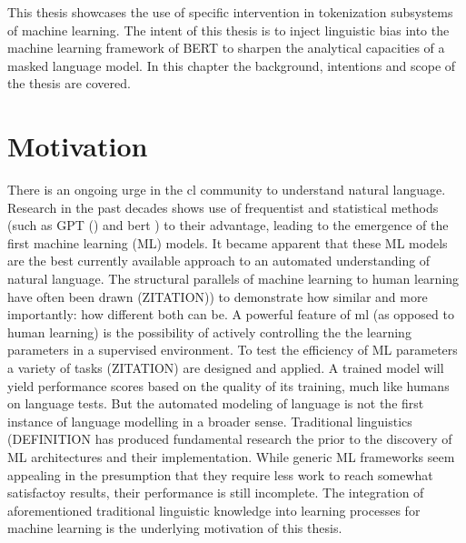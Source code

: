 
This thesis showcases the use of specific intervention in tokenization subsystems of machine learning.
The intent of this thesis is to inject linguistic bias into the machine learning framework of BERT to sharpen the analytical capacities of a masked language model.
In this chapter the background, intentions and scope of the thesis are covered.


\section{Motivation}
\label{sec:motivation}
There is an ongoing urge in the \acf{cl} community to understand natural language.
Research in the past decades shows use of frequentist and statistical methods (such as GPT (\cite{gpt}) and bert \cite{ATTENTION}) to their advantage, leading to the emergence of the first machine learning (ML) models.
It became apparent that these ML models are the best currently available approach to an automated understanding of natural language.
The structural parallels of machine learning to human learning have often been drawn (\uppercase{zitation)}) to demonstrate how similar and more importantly: how different both can be.
A powerful feature of \ac{ml} (as opposed to human learning) is the possibility of actively controlling the the learning parameters in a supervised environment.
To test the efficiency of \uppercase{ML} parameters a variety of tasks (\uppercase{zitation}) are designed and applied.
A trained model will yield performance scores based on the quality of its training, much like humans on language tests.
But the automated modeling of language is not the first instance of language modelling in a broader sense.
Traditional linguistics (\uppercase{definition} has produced fundamental research the prior to the discovery of \uppercase{ML} architectures and their implementation.
While generic ML frameworks seem appealing in the presumption that they require less work to reach somewhat satisfactoy results,
their performance is still incomplete.
The integration of aforementioned traditional linguistic knowledge into learning processes for machine learning is the underlying motivation of this thesis.


